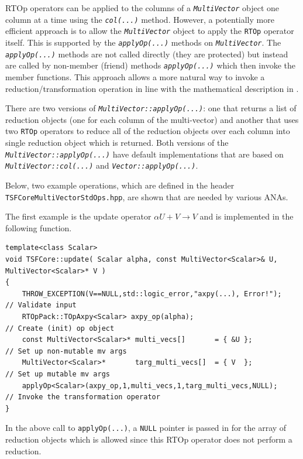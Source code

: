 RTOp operators can be applied to the columns of a
\texttt{\textit{Multi\-Vector}} object one column at a time
using the \texttt{\textit{col(...)}} method.  However, a potentially
more efficient approach is to allow the
\texttt{\textit{Multi\-Vector}} object to apply the \texttt{RTOp} operator itself.
This is supported by the \texttt{\textit{applyOp(\-...)}} methods on
\texttt{\textit{Multi\-Vector}}.  The \texttt{\textit{applyOp(\-...)}} methods are not
called directly (they are protected) but instead are called by
non-member (friend) methods \texttt{\textit{applyOp(\-...)}} which then
invoke the member functions.  This
approach allows a more natural way to invoke a
reduction/transformation operation in line with the mathematical
description in \cite{ref:rtop_toms}.

There are two versions of
\texttt{\textit{Multi\-Vector\-::applyOp(\-...)}}: one that returns a list
of reduction objects (one for each column of the multi-vector) and
another that uses two \texttt{RTOp} operators to reduce all of the
reduction objects over each column into single reduction object which
is returned.  Both versions of the
\texttt{\textit{Multi\-Vector\-::applyOp(\-...)}} have default implementations
that are based on \texttt{\textit{Multi\-Vector\-::col(...)}} and
\texttt{\textit{Vector\-::applyOp(\-...)}}.

Below, two example operations, which are defined in the header
\texttt{TSFCore\-Multi\-Vector\-Std\-Ops.hpp}, are shown that are needed
by various ANAs.

The first example is the update operator $\alpha U + V \rightarrow V$
and is implemented in the following function.

{\scriptsize\begin{verbatim}
template<class Scalar>
void TSFCore::update( Scalar alpha, const MultiVector<Scalar>& U, MultiVector<Scalar>* V )
{
    THROW_EXCEPTION(V==NULL,std::logic_error,"axpy(...), Error!");    // Validate input
    RTOpPack::TOpAxpy<Scalar> axpy_op(alpha);                         // Create (init) op object
    const MultiVector<Scalar>* multi_vecs[]       = { &U };           // Set up non-mutable mv args
    MultiVector<Scalar>*       targ_multi_vecs[]  = { V  };           // Set up mutable mv args
    applyOp<Scalar>(axpy_op,1,multi_vecs,1,targ_multi_vecs,NULL);     // Invoke the transformation operator
}
\end{verbatim}}

\noindent In the above call to \texttt{applyOp(\-...)}, a \texttt{NULL} pointer is
passed in for the array of reduction objects which is allowed since
this RTOp operator does not perform a reduction.

